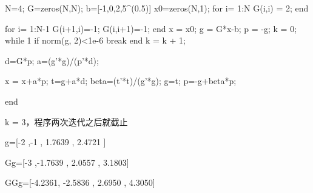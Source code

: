 \documentclass[]{article}
\newenvironment{Shaded}{}{}
\newcommand{\FloatTok}[1]{\textcolor[rgb]{0.25,0.63,0.44}{#1}}
\newcommand{\NormalTok}[1]{#1}
\begin{document}
\begin{Shaded}
\begin{Highlighting}[]
\NormalTok{N=}\FloatTok{4}\NormalTok{;}
\NormalTok{G=zeros(N,N);}
\NormalTok{b=[-}\FloatTok{1}\NormalTok{,}\FloatTok{0}\NormalTok{,}\FloatTok{2}\NormalTok{,}\FloatTok{5}\NormalTok{^(}\FloatTok{0.5}\NormalTok{)]}
\NormalTok{x0=zeros(N,}\FloatTok{1}\NormalTok{);}
\NormalTok{for i= }\FloatTok{1}\NormalTok{:N}
\NormalTok{     G(i,i) = }\FloatTok{2}\NormalTok{;}
\NormalTok{end}

\NormalTok{for i= }\FloatTok{1}\NormalTok{:N-}\FloatTok{1}
\NormalTok{    G(i+}\FloatTok{1}\NormalTok{,i)=-}\FloatTok{1}\NormalTok{;}
\NormalTok{    G(i,i+}\FloatTok{1}\NormalTok{)=-}\FloatTok{1}\NormalTok{;}
\NormalTok{end}
\NormalTok{    x = x0;}
\NormalTok{    g = G*x-b;}
\NormalTok{    p = -g;}
\NormalTok{    k = }\FloatTok{0}\NormalTok{;}
\NormalTok{    while }\FloatTok{1}
\NormalTok{        if norm(g, }\FloatTok{2}\NormalTok{)<}\FloatTok{1e-6}
\NormalTok{            break}
\NormalTok{        end}
\NormalTok{        k = k + }\FloatTok{1}\NormalTok{;}
        
\NormalTok{        d=G*p;}
\NormalTok{        a=(g'*g)/(p'*d);}

\NormalTok{        x = x+a*p;}
\NormalTok{        t=g+a*d;}
\NormalTok{       beta=(t'*t)/(g'*g);}
\NormalTok{       g=t;}
\NormalTok{       p=-g+beta*p;}
  
\NormalTok{    end}
\end{Highlighting}
\end{Shaded}

k = 3，程序两次迭代之后就截止

g={[}-2 ,-1 , 1.7639 , 2.4721 {]}

Gg={[}-3 ,-1.7639 , 2.0557 , 3.1803{]}

GGg={[}-4.2361, -2.5836 , 2.6950 , 4.3050{]}
\end{document}

